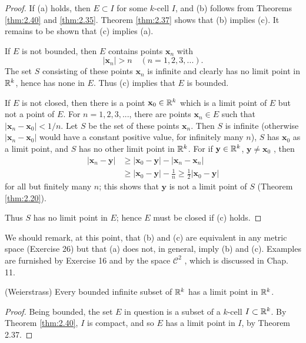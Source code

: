 \begin{proof}
    If (a) holds, then $E \subset I$ for some $k$-cell $I$, 
    and (b) follows from Theorems \ref{thm:2.40} and \ref{thm:2.35}. 
    Theorem \ref{thm:2.37} shows that (b) implies (c). 
    It remains to be shown that (c) implies (a).

    If $E$ is not bounded, then $E$ contains points $\mathbf{x}_n$ with
    \begin{equation*}
        \left| \mathbf{x}_n \right| > n
        \quad
        (n = 1, 2, 3, ... ).        
    \end{equation*}
    The set $S$ consisting of these points $\mathbf{x}_n$ is infinite and clearly has no limit point in ${\protect\mathbb R}^{k}$, hence has none in $E$. 
    Thus (c) implies that $E$ is bounded.
    
    If $E$ is not closed, then there is a point $\mathbf{x}_0 \in  {\protect\mathbb R}^{k}$ which is a limit point of $E$ but not a point of $E$. 
    For $n = 1, 2, 3, ... $, there are points $\mathbf{x}_n \in E$ 
    such that $\left| \mathbf{x}_n - \mathbf{x}_0 \right| < 1/n$. 
    Let $S$ be the set of these points $\mathbf{x}_n$. 
    Then $S$ is infinite (otherwise $\left| \mathbf{x}_n - \mathbf{x}_0 \right| $ would have a constant positive value, for infinitely many $n$), 
    $S$ has $\mathbf{x}_0$ as a limit point, 
    and $S$ has no other limit point in ${\protect\mathbb R}^{k}$. 
    For if $\mathbf{y} \in {\protect\mathbb R}^{k}$, $\mathbf{y} \neq \mathbf{x}_0$ , then
    \begin{align*}
        \left| \mathbf{x}_n - \mathbf{y} \right| 
        &\geq
        \left| \mathbf{x}_0 - \mathbf{y} \right| -
        \left| \mathbf{x}_n - \mathbf{x}_n \right| \\
        &\geq 
        \left| \mathbf{x}_0 - \mathbf{y} \right| - \frac{1}{n}
        \geq \frac{1}{2}
        \left| \mathbf{x}_0 - \mathbf{y} \right|
    \end{align*} 
    for all but finitely many $n$; 
    this shows that $\mathbf{y}$ is not a limit point of $S$ (Theorem \ref{thm:2.20}).

    Thus $S$ has no limit point in $E$; hence $E$ must be closed if (c) holds.
\end{proof}

We should remark, at this point, that (b) and (c) are equivalent in any
metric space (Exercise 26) but that (a) does not, in general, imply (b) and (c).
Examples are furnished by Exercise 16 and by the space $\mathscr{C}^2$ , which is discussed in Chap. 11.

\begin{thm}(Weierstrass)
    \label{thm:2.42}
    Every bounded infinite subset of ${\protect\mathbb R}^k$ has a limit point in ${\protect\mathbb R}^k$.
\end{thm}
\begin{proof}
    Being bounded, the set $E$ in question is a subset of a $k$-cell $I\subset {\protect\mathbb R}^k$.
    By Theorem \ref{thm:2.40}, $I$ is compact, 
    and so $E$ has a limit point in $I$, by Theorem 2.37.
\end{proof}